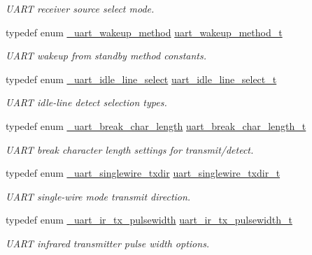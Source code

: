 \begin{DoxyCompactItemize}
\begin{DoxyCompactList}\small\item\em U\+A\+RT receiver source select mode. \end{DoxyCompactList}\item 
typedef enum \hyperlink{group__uart__hal_gac4479526dd3c0c5406e7c553e2c797d5}{\+\_\+uart\+\_\+wakeup\+\_\+method} \hyperlink{group__uart__hal_ga6aa156a75707a0cd36921c54080e2726}{uart\+\_\+wakeup\+\_\+method\+\_\+t}
\begin{DoxyCompactList}\small\item\em U\+A\+RT wakeup from standby method constants. \end{DoxyCompactList}\item 
typedef enum \hyperlink{group__uart__hal_gafcbb35202aa124845649edb0607d994d}{\+\_\+uart\+\_\+idle\+\_\+line\+\_\+select} \hyperlink{group__uart__hal_ga9082a7f856054fd3a754ec115f91ac6b}{uart\+\_\+idle\+\_\+line\+\_\+select\+\_\+t}
\begin{DoxyCompactList}\small\item\em U\+A\+RT idle-\/line detect selection types. \end{DoxyCompactList}\item 
typedef enum \hyperlink{group__uart__hal_gafc836c7460339592ca74ec409835dabb}{\+\_\+uart\+\_\+break\+\_\+char\+\_\+length} \hyperlink{group__uart__hal_ga8a5d7a3ed1043bb5a67f1b5d3e9d6453}{uart\+\_\+break\+\_\+char\+\_\+length\+\_\+t}
\begin{DoxyCompactList}\small\item\em U\+A\+RT break character length settings for transmit/detect. \end{DoxyCompactList}\item 
typedef enum \hyperlink{group__uart__hal_ga18cefb04a659432f96e2166b2205765a}{\+\_\+uart\+\_\+singlewire\+\_\+txdir} \hyperlink{group__uart__hal_ga5a158787a6da225f49f2372634b670c6}{uart\+\_\+singlewire\+\_\+txdir\+\_\+t}
\begin{DoxyCompactList}\small\item\em U\+A\+RT single-\/wire mode transmit direction. \end{DoxyCompactList}\item 
typedef enum \hyperlink{group__uart__hal_ga9bf0284b094edf04f6b91db68f20ed7d}{\+\_\+uart\+\_\+ir\+\_\+tx\+\_\+pulsewidth} \hyperlink{group__uart__hal_ga07f48dd4b36c6a6e57138108697fbbd9}{uart\+\_\+ir\+\_\+tx\+\_\+pulsewidth\+\_\+t}
\begin{DoxyCompactList}\small\item\em U\+A\+RT infrared transmitter pulse width options. \end{DoxyCompactList}\item 

\end{DoxyCompactItemize}
